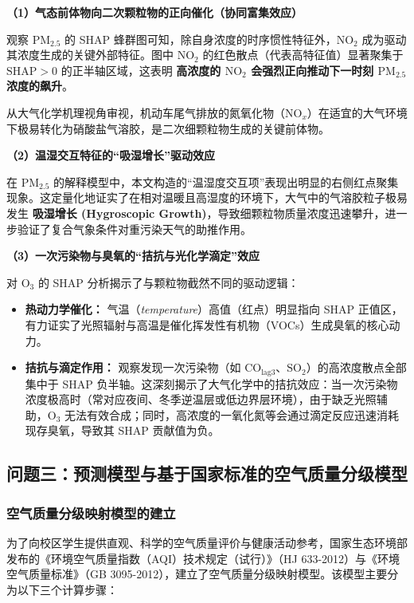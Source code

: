 \documentclass[a4paper, 12pt]{ctexart} %
\begin{document}
\textbf{（1）气态前体物向二次颗粒物的正向催化（协同富集效应）}

观察 $\text{PM}_{2.5}$ 的 SHAP 蜂群图可知，除自身浓度的时序惯性特征外，$\text{NO}_2$ 成为驱动其浓度生成的关键外部特征。图中 $\text{NO}_2$ 的红色散点（代表高特征值）显著聚集于 $\text{SHAP} > 0$ 的正半轴区域，这表明 \textbf{高浓度的 $\text{NO}_2$ 会强烈正向推动下一时刻 $\text{PM}_{2.5}$ 浓度的飙升}。

从大气化学机理视角审视，机动车尾气排放的氮氧化物（$\text{NO}_x$）在适宜的大气环境下极易转化为硝酸盐气溶胶，是二次细颗粒物生成的关键前体物。

\textbf{（2）温湿交互特征的“吸湿增长”驱动效应}

在 $\text{PM}_{2.5}$ 的解释模型中，本文构造的“温湿度交互项”表现出明显的右侧红点聚集现象。这定量化地证实了在相对温暖且高湿度的环境下，大气中的气溶胶粒子极易发生 \textbf{吸湿增长 (Hygroscopic Growth)}，导致细颗粒物质量浓度迅速攀升，进一步验证了复合气象条件对重污染天气的助推作用。

\textbf{（3）一次污染物与臭氧的“拮抗与光化学滴定”效应}

对 $\text{O}_3$ 的 SHAP 分析揭示了与颗粒物截然不同的驱动逻辑：
\begin{itemize}[itemsep=0pt, parsep=0pt]
    \item \textbf{热动力学催化：} 气温（\textit{temperature}）高值（红点）明显指向 SHAP 正值区，有力证实了光照辐射与高温是催化挥发性有机物（VOCs）生成臭氧的核心动力。
    \item \textbf{拮抗与滴定作用：} 观察发现一次污染物（如 $\text{CO}_{\text{lag3}}$、$\text{SO}_2$）的高浓度散点全部集中于 SHAP 负半轴。这深刻揭示了大气化学中的拮抗效应：当一次污染物浓度极高时（常对应夜间、冬季逆温层或低边界层环境），由于缺乏光照辅助，$\text{O}_3$ 无法有效合成；同时，高浓度的一氧化氮等会通过滴定反应迅速消耗现存臭氧，导致其 SHAP 贡献值为负。
\end{itemize}


\bigskip
\subsection{问题三：预测模型与基于国家标准的空气质量分级模型}

\subsubsection{空气质量分级映射模型的建立}
为了向校区学生提供直观、科学的空气质量评价与健康活动参考，国家生态环境部发布的《环境空气质量指数（AQI）技术规定（试行）》（HJ 633-2012）\cite{tech}与《环境空气质量标准》（GB 3095-2012）\cite{standard}，建立了空气质量分级映射模型。该模型主要分为以下三个计算步骤：
\end{document}
